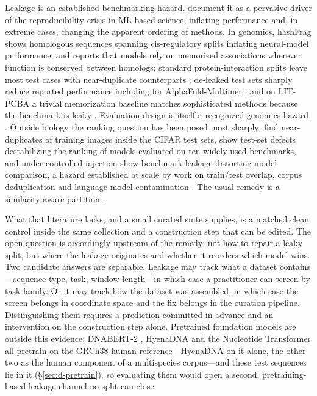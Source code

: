 \documentclass[webpdf,modern,large,namedate]{oup-authoring-template}%
\begin{document}
Leakage is an established benchmarking hazard. \citet{kapoor2023leakage} document it as a pervasive driver of the reproducibility crisis in ML-based science, inflating performance and, in extreme cases, changing the apparent ordering of methods. In genomics, hashFrag \citep{rafi2026} shows homologous sequences spanning cis-regulatory splits inflating neural-model performance, and reports that models rely on memorized associations wherever function is conserved between homologs; standard protein-interaction splits leave most test cases with near-duplicate counterparts \citep{bushuiev2024}; de-leaked test sets sharply reduce reported performance including for AlphaFold-Multimer \citep{kovtun2024}; and on LIT-PCBA a trivial memorization baseline matches sophisticated methods because the benchmark is leaky \citep{huang2025}. Evaluation design is itself a recognized genomics hazard \citep{whalen2022pitfalls,schreiber2020pitfall,toneyan2022evaluating}. Outside biology the ranking question has been posed most sharply: \citet{barz2020cifar} find near-duplicates of training images inside the CIFAR test sets, \citet{northcutt2021labelerrors} show test-set defects destabilizing the ranking of models evaluated on ten widely used benchmarks, and under controlled injection \citet{zhou2023cheater} show benchmark leakage distorting model comparison, a hazard established at scale by work on train/test overlap, corpus deduplication and language-model contamination \citep{elangovan2021leakage,lee2022dedup,sainz2023contamination,magar2022contamination,deng2024contamination}. The usual remedy is a similarity-aware partition \citep{hobohm1992,walsh2016correct,teufel2023graphpart,petti2022benchmark,li2006cdhit,steinegger2017mmseqs2}.

What that literature lacks, and a small curated suite supplies, is a matched clean control inside the same collection and a construction step that can be edited. The open question is accordingly upstream of the remedy: not how to repair a leaky split, but where the leakage originates and whether it reorders which model wins. Two candidate answers are separable. Leakage may track what a dataset contains---sequence type, task, window length---in which case a practitioner can screen by task family. Or it may track how the dataset was assembled, in which case the screen belongs in coordinate space and the fix belongs in the curation pipeline. Distinguishing them requires a prediction committed in advance and an intervention on the construction step alone. Pretrained foundation models are outside this evidence: DNABERT-2 \citep{zhou2023dnabert2}, HyenaDNA \citep{nguyen2023hyenadna} and the Nucleotide Transformer \citep{dallatorre2024nucleotide} all pretrain on the GRCh38 human reference---HyenaDNA on it alone, the other two as the human component of a multispecies corpus---and these test sequences lie in it (\S\ref{sec:d-pretrain}), so evaluating them would open a second, pretraining-based leakage channel no split can close.
\end{document}
